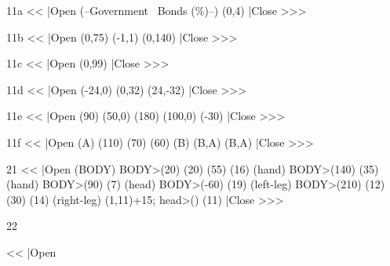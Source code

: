 {1{1a}
\<<<
|Open
\Text(--Government~%
              Bonds (\%)--)  
\Table{} 
\B(0,4){\PutBar} 
|Close >>>

1{1b}
\<<<
|Open
\chick(0,75)  \Scale(-1,1) 
\chick(0,140) 
|Close >>>

1{1c}
\<<<
|Open
\Table{}   \x(0,99){\Tr}  
|Close >>>

1{1d}
\<<<
|Open
\sqr(-24,0) 
\sqr(0,32) 
\sqr(24,-32)
|Close >>>

1{1e}
\<<<
|Open
\engine(90)  \MoveTo(50,0)  
\engine(180) \MoveTo(100,0) 
\engine(-30) 
|Close >>>

1{1f}
\<<<
|Open
\MarkLoc(A) 
\spring(110) \Rotate(70) 
\spring(60)  \MarkLoc(B)
\DSeg\RotateTo(B,A)  
\LSeg\spring(B,A)  
|Close >>>

21
\<<<
|Open
\new(BODY) \<BODY>(20)
\LineF(20) \Rotate(55) \LineF(16) 
\new(hand) \<BODY>(140) \LineF(35)  
\new(hand) \<BODY>(90) \LineF(7)  
\new(head) \<BODY>(-60) \LineF(19)  
\new(left-leg) \<BODY>(210) \LineF(12) 
\Rotate(30) \LineF(14) \new(right-leg)
\Do(1,11){\I+15; \<head>(\Val\I) 
\LineF(11)} 
|Close >>>


22

\<<<
|Open
\def\DefineSymbol#1{%
   \Indirect\Define<#1>}

\def\DrawText(--#1--){%
     \let\xNextSym=\xDrawSym  \xNextSym#1{}}

\def\xDrawSym#1{\def\temp{#1}%
     \ifx \temp\empty  \let \xNextSym=\relax
     \else \Indirect<#1>\fi   \xNextSym }

}
